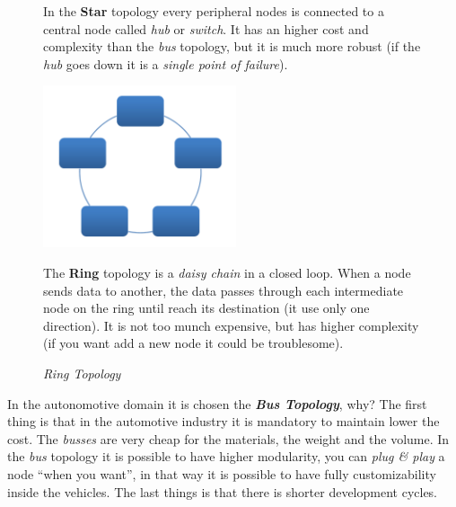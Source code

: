 \begin{figure}[h]
\begin{minipage}[t]{0.3\textwidth}
        \begin{flushleft}
            In the \textbf{Star} topology every peripheral nodes is connected to a central node called \textit{hub} or \textit{switch}. It has an higher cost and complexity than the \textit{bus} topology, but it is much more robust (if the \textit{hub} goes down it is a \textit{single point of failure}).
        \end{flushleft}
        
    \end{minipage}
    \begin{minipage}[t]{0.3\textwidth}
        \centering
        \includegraphics[width=\textwidth]{img/ring}
        \caption{\textit{Ring Topology}}
        
        \begin{flushleft}
            The \textbf{Ring} topology is a \textit{daisy chain} in a closed loop. When a node sends data to another, the data passes through each intermediate node on the ring until reach its destination (it use only one direction). It is not too munch expensive, but has higher complexity (if you want add a new node it could be troublesome).
        \end{flushleft}
        
    \end{minipage}
\end{figure}
In the autonomotive domain it is chosen the \textbf{\textit{Bus Topology}}, why? The first thing is that in the automotive industry it is mandatory to maintain lower the cost. The \textit{busses} are very cheap for the materials, the weight and the volume. In the \textit{bus} topology it is possible to have higher modularity, you can \textit{plug \& play} a node ``when you want'', in that way it is possible to have fully customizability inside the vehicles. The last things is that there is shorter development cycles.
